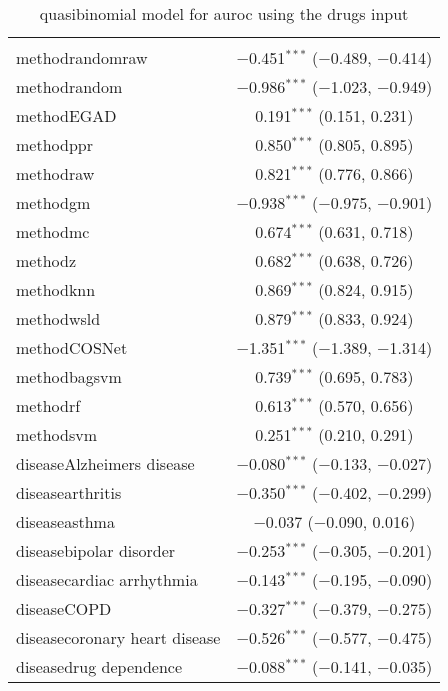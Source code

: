 
\begin{table}[!htbp] \centering 
  \caption{quasibinomial model for auroc using the drugs input} 
  \label{} 
\begin{tabular}{@{\extracolsep{5pt}}lc} 
\\[-1.8ex]\hline 
\hline \\[-1.8ex] 
 methodrandomraw & $-$0.451$^{***}$ ($-$0.489, $-$0.414) \\ 
  methodrandom & $-$0.986$^{***}$ ($-$1.023, $-$0.949) \\ 
  methodEGAD & 0.191$^{***}$ (0.151, 0.231) \\ 
  methodppr & 0.850$^{***}$ (0.805, 0.895) \\ 
  methodraw & 0.821$^{***}$ (0.776, 0.866) \\ 
  methodgm & $-$0.938$^{***}$ ($-$0.975, $-$0.901) \\ 
  methodmc & 0.674$^{***}$ (0.631, 0.718) \\ 
  methodz & 0.682$^{***}$ (0.638, 0.726) \\ 
  methodknn & 0.869$^{***}$ (0.824, 0.915) \\ 
  methodwsld & 0.879$^{***}$ (0.833, 0.924) \\ 
  methodCOSNet & $-$1.351$^{***}$ ($-$1.389, $-$1.314) \\ 
  methodbagsvm & 0.739$^{***}$ (0.695, 0.783) \\ 
  methodrf & 0.613$^{***}$ (0.570, 0.656) \\ 
  methodsvm & 0.251$^{***}$ (0.210, 0.291) \\ 
  diseaseAlzheimers disease & $-$0.080$^{***}$ ($-$0.133, $-$0.027) \\ 
  diseasearthritis & $-$0.350$^{***}$ ($-$0.402, $-$0.299) \\ 
  diseaseasthma & $-$0.037 ($-$0.090, 0.016) \\ 
  diseasebipolar disorder & $-$0.253$^{***}$ ($-$0.305, $-$0.201) \\ 
  diseasecardiac arrhythmia & $-$0.143$^{***}$ ($-$0.195, $-$0.090) \\ 
  diseaseCOPD & $-$0.327$^{***}$ ($-$0.379, $-$0.275) \\ 
  diseasecoronary heart disease & $-$0.526$^{***}$ ($-$0.577, $-$0.475) \\ 
  diseasedrug dependence & $-$0.088$^{***}$ ($-$0.141, $-$0.035) \\ 

\end{tabular}
\end{table}
